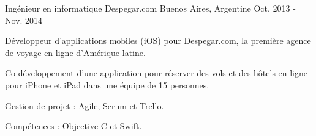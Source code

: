 \begin{cventries}
\cventry
{Ingénieur en informatique}
{Despegar.com}
{Buenos Aires, Argentine}
{Oct. 2013 - Nov. 2014}
{
\begin{cvitems}
\item Développeur d'applications mobiles (iOS) pour Despegar.com, la première agence de voyage en ligne d'Amérique latine.
\item Co-développement d'une application pour réserver des vols et des hôtels en ligne pour iPhone et iPad dans une équipe de 15 personnes. 
\item Gestion de projet : Agile, Scrum et Trello.
\item Compétences : Objective-C et Swift.
\end{cvitems}
} 
\end{cventries}
